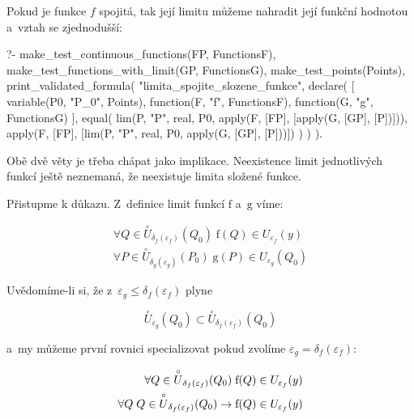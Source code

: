 Pokud je funkce \(f\) spojitá, tak její limitu můžeme nahradit její funkční hodnotou a~vztah se zjednodušší:

\begin{prolog}
?-	make_test_continuous_functions(FP, FunctionsF),
	make_test_functions_with_limit(GP, FunctionsG),
	make_test_points(Points),
	print_validated_formula(
		"limita_spojite_slozene_funkce",
		declare(
			[
				variable(P0, "P_0", Points),
				function(F, "f", FunctionsF),
				function(G, "g", FunctionsG)
			],
			equal(
				lim(P, "P", real, P0, apply(F, [FP], [apply(G, [GP], [P])])),
				apply(F, [FP], [lim(P, "P", real, P0, apply(G, [GP], [P]))])
			)
		)
	).
\end{prolog}

Obě dvě věty je třeba chápat jako implikace. Neexistence limit jednotlivých funkcí ještě neznemaná, že neexistuje limita složené funkce.

Přistupme k důkazu. Z~definice limit funkcí \(\mathrm{f}\) a~\(\mathrm{g}\) víme:

\begin{equation}
\begin{split}
\forall Q \in \overset{\circ}{U}_{\delta_f(\varepsilon_f)}(Q_0) \; \mathrm{f}(Q) \in U_{\varepsilon_f}(y) \\
\forall P \in \overset{\circ}{U}_{\delta_g(\varepsilon_g)}(P_0) \; \mathrm{g}(P) \in U_{\varepsilon_g}(Q_0)
\end{split}
\end{equation}

Uvědomíme-li si, že z~\(\varepsilon_g \leq \delta_f(\varepsilon_f)\) plyne

\begin{equation}
\overset{\circ}{U}_{\varepsilon_g}(Q_0) \subset \overset{\circ}{U}_{\delta_f(\varepsilon_f)}(Q_0)
\end{equation}

a~my můžeme první rovnici specializovat pokud zvolíme \(\varepsilon_g = \delta_f(\varepsilon_f)\):

\begin{equation}
\begin{split}
\forall Q \in \overset{\circ}{U}_{\delta_f(\varepsilon_f)}(Q_0) \; \mathrm{f}(Q) \in U_{\varepsilon_f}(y) \\
\forall Q \; Q \in \overset{\circ}{U}_{\delta_f(\varepsilon_f)}(Q_0) \rightarrow \mathrm{f}(Q) \in U_{\varepsilon_f}(y)
\end{split}
\end{equation}

